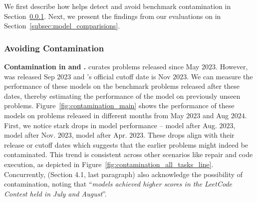 We first describe how \livecodebench{} helps detect and avoid benchmark contamination in Section~\ref{subsec:contamination}. 
Next, we present the findings from our evaluations on \livecodebench{} in Section~\ref{subsec:model_comparisions}.



\subsubsection{Avoiding Contamination}
\label{subsec:contamination}

\noindent \textbf{Contamination in \deepseek{} and \gptfouro{}.}
\livecodebench{} curates problems released since May $2023$. 
However, \deepseek{} was released Sep $2023$ and \gptfouro{}'s official cutoff date is Nov $2023$.
We can measure the performance of these models on the benchmark problems released after these dates, thereby estimating the performance of the model on previously unseen problems.
Figure~\ref{fig:contamination_main} shows the performance of these models on \leetcode{} problems released in different months from May $2023$ and Aug $2024$. 
First, we notice stark drops in model performance --   model after Aug. $2023$, 
\gptfouro{} model after Nov. $2023$, 
\claudethrees{} model after Apr. $2023$.
These drops align with their release or cutoff dates which suggests that the earlier problems might indeed be contaminated.
This trend is consistent across other \livecodebench{} scenarios like repair and code execution, as depicted in Figure~\ref{fig:contamination_all_tasks_line}.
Concurrently, \citep{deepseek-coder} (Section 4.1, last paragraph) also acknowledge the possibility of \leetcode{} contamination, noting that ``\textit{models achieved higher scores in the LeetCode Contest held in July and August}''.

